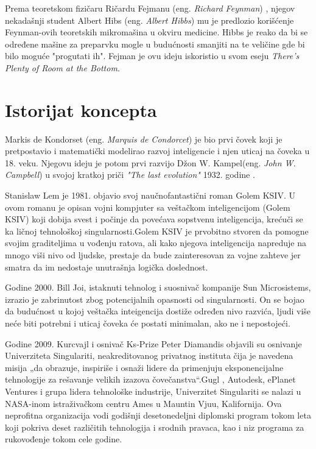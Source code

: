 \documentclass[a4paper]{article}
\begin{document}
  Prema teoretskom fizičaru Ričardu Fejmanu (eng. \textit{Richard Feynman}) , njegov nekadašnji student Albert Hibs (eng. \textit{Albert Hibbs}) mu je predlozio korišćenje Feynman-ovih teoretskih mikromašina u okviru medicine. Hibbs je reako da bi se određene mašine za preparvku mogle u budućnosti smanjiti na te veličine gde bi bilo moguće "progutati ih". Fejman je ovu ideju iskoristio u svom eseju \textit{ There's Plenty of Room at the Bottom.}\cite{refe4}
\section{Istorijat koncepta}
\label{sec:istorijat}

Markis de Kondorset (eng. \textit{Marquis de Condorcet}) je bio prvi čovek koji je pretpostavio i matematički modelirao razvoj inteligencie i njen uticaj na čoveka u 18. veku. Njegovu ideju je potom prvi razvijo Džon W. Kampel(eng. \textit{John W. Campbell}) u svojoj kratkoj priči\textit{ "The last evolution"} 1932. godine .\cite{refe5}

Stanislaw Lem je 1981. objavio svoj naučnofantastični roman Golem KSIV. U ovom romanu je opisan vojni kompjuter sa veštačkom inteligencijom (Golem KSIV) koji dobija svest i počinje da povećava sopstvenu inteligencija, krećuči se ka ličnoj tehnološkoj singularnosti.\cite{refe6}Golem KSIV je prvobitno stvoren da pomogne svojim graditeljima u vođenju ratova, ali kako njegova inteligencija napreduje na mnogo viši nivo od ljudske, prestaje da bude zainteresovan za vojne zahteve jer smatra da im nedostaje unutrašnja logička doslednost.\cite{refe7}

Godine 2000. Bill Joi, istaknuti tehnolog i suosnivač kompanije Sun Microsistems, izrazio je zabrinutost zbog potencijalnih opasnosti od singularnosti. On se bojao da budućnost u kojoj veštačka inteigencija dostiže određen nivo razvića, ljudi više neće biti potrebni i uticaj čoveka će postati minimalan, ako ne i nepostojeći.

Godine 2009. Kurcvajl i osnivač Ks-Prize Peter Diamandis objavili su osnivanje Univerziteta Singulariti, neakreditovanog privatnog instituta čija je navedena misija „da obrazuje, inspiriše i osnaži lidere da primenjuju eksponencijalne tehnologije za rešavanje velikih izazova čovečanstva“.Gugl , Autodesk, ePlanet Ventures i grupa lidera tehnološke industrije, Univerzitet Singulariti se nalazi u NASA-inom istraživačkom centru Ames u Mauntin Vjuu, Kalifornija. Ova neprofitna organizacija vodi godišnji desetonedeljni diplomski program tokom leta koji pokriva deset različitih tehnologija i srodnih pravaca, kao i niz programa za rukovođenje tokom cele godine.\cite{refe8}
\end{document}
